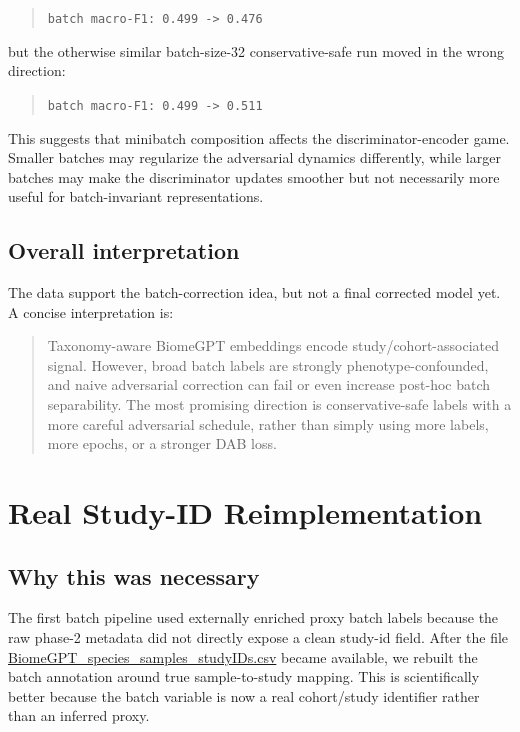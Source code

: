 \documentclass[11pt]{article}
\newcommand{\code}[1]{\texttt{\small #1}}
\newcommand{\filepath}[1]{\begingroup\urlstyle{tt}\small\url{#1}\endgroup}
\begin{document}
\begin{quote}
\code{batch macro-F1: 0.499 -> 0.476}
\end{quote}

but the otherwise similar batch-size-32 conservative-safe run moved in the wrong
direction:

\begin{quote}
\code{batch macro-F1: 0.499 -> 0.511}
\end{quote}

This suggests that minibatch composition affects the discriminator-encoder game. Smaller
batches may regularize the adversarial dynamics differently, while larger batches may make
the discriminator updates smoother but not necessarily more useful for batch-invariant
representations.

\subsection{Overall interpretation}

The data support the batch-correction idea, but not a final corrected model yet. A concise
interpretation is:

\begin{quote}
Taxonomy-aware BiomeGPT embeddings encode study/cohort-associated signal. However, broad
batch labels are strongly phenotype-confounded, and naive adversarial correction can fail
or even increase post-hoc batch separability. The most promising direction is
conservative-safe labels with a more careful adversarial schedule, rather than simply using
more labels, more epochs, or a stronger DAB loss.
\end{quote}

\section{Real Study-ID Reimplementation}

\subsection{Why this was necessary}

The first batch pipeline used externally enriched proxy batch labels because the raw
phase-2 metadata did not directly expose a clean study-id field. After the file
\filepath{BiomeGPT_species_samples_studyIDs.csv} became available, we rebuilt the batch
annotation around true sample-to-study mapping. This is scientifically better because the
batch variable is now a real cohort/study identifier rather than an inferred proxy.
\end{document}
